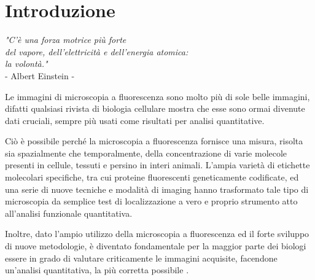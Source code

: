 \clearpage{\pagestyle{empty}\cleardoublepage}
\chapter*{Introduzione} 
\begin{flushright}\begin{small}\textit{"C'è una forza motrice più forte\\ del vapore, dell'elettricità e dell'energia atomica:\\ la volontà."}\\
- Albert Einstein -\\
\end{small}\end{flushright}

Le immagini di microscopia a fluorescenza sono molto più di sole belle immagini, difatti qualsiasi rivista di biologia cellulare mostra che esse sono ormai divenute dati cruciali, sempre più usati come risultati per analisi quantitative.

Ciò è possibile perché la microscopia a fluorescenza fornisce una misura, risolta sia spazialmente che temporalmente, della concentrazione di varie molecole presenti in cellule, tessuti e persino in interi animali. 
L'ampia varietà di etichette molecolari specifiche, tra cui proteine fluorescenti geneticamente codificate, ed una serie di nuove tecniche e modalità di imaging  hanno trasformato tale tipo di microscopia da semplice test di localizzazione a vero e proprio strumento atto all'analisi funzionale quantitativa. 

Inoltre, dato l'ampio utilizzo della microscopia a fluorescenza ed il forte sviluppo di nuove metodologie, è diventato fondamentale per la maggior parte dei biologi essere in grado di valutare criticamente le immagini acquisite, facendone un'analisi quantitativa, la più corretta possibile \cite{fluo}.

